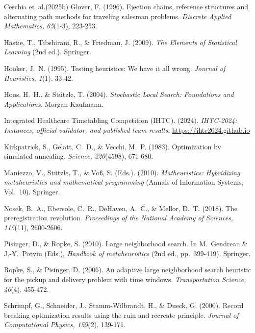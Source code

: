 \documentclass[11pt]{article}
\begin{document}
\begin{thebibliography}{Ceschia et~al.(2025b)}
		Glover, F. (1996).
		Ejection chains, reference structures and alternating path methods for traveling salesman problems.
		\emph{Discrete Applied Mathematics, 65}(1-3), 223-253.

		Hastie, T., Tibshirani, R., \& Friedman, J. (2009).
		\emph{The Elements of Statistical Learning} (2nd ed.). Springer.

		Hooker, J.~N. (1995).
		Testing heuristics: We have it all wrong.
		\emph{Journal of Heuristics, 1}(1), 33-42.

		Hoos, H.~H., \& St\"utzle, T. (2004).
		\emph{Stochastic Local Search: Foundations and Applications}. Morgan Kaufmann.

		Integrated Healthcare Timetabling Competition (IHTC). (2024).
		\emph{IHTC-2024: Instances, official validator, and published team results}.
		\url{https://ihtc2024.github.io}
		
		Kirkpatrick, S., Gelatt, C.~D., \& Vecchi, M.~P. (1983).
		Optimization by simulated annealing. \emph{Science, 220}(4598), 671-680.
		
		Maniezzo, V., St\"utzle, T., \& Vo\ss, S. (Eds.). (2010).
		\emph{Matheuristics: Hybridizing metaheuristics and mathematical programming}
		(Annals of Information Systems, Vol.~10). Springer.
		
		Nosek, B.~A., Ebersole, C.~R., DeHaven, A.~C., \& Mellor, D.~T. (2018).
		The preregistration revolution.
		\emph{Proceedings of the National Academy of Sciences, 115}(11), 2600-2606.

		Pisinger, D., \& Ropke, S. (2010).
		Large neighborhood search. In M.~Gendreau \& J.-Y.~Potvin (Eds.),
		\emph{Handbook of metaheuristics} (2nd ed., pp.~399-419). Springer.
		
		Ropke, S., \& Pisinger, D. (2006).
		An adaptive large neighborhood search heuristic for the pickup and delivery problem with time windows.
		\emph{Transportation Science, 40}(4), 455-472.
		
		Schrimpf, G., Schneider, J., Stamm-Wilbrandt, H., \& Dueck, G. (2000).
		Record breaking optimization results using the ruin and recreate principle.
		\emph{Journal of Computational Physics, 159}(2), 139-171.
		

\end{thebibliography}
\end{document}
